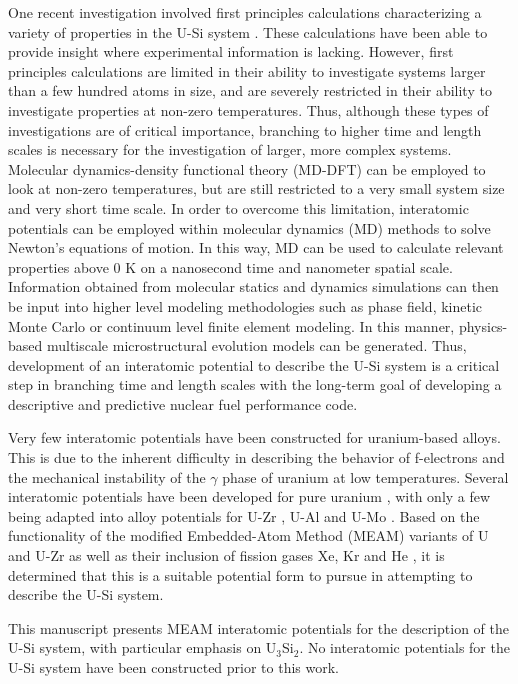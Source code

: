 \documentclass[review]{elsarticle}
\begin{document}
One recent investigation involved first principles calculations characterizing a variety of properties in the U-Si system \cite{noordhoek2016}.  These calculations have been able to provide insight where experimental information is lacking.  However, first principles calculations are limited in their ability to investigate systems larger than a few hundred atoms in size, and are severely restricted in their ability to investigate properties at non-zero temperatures.  Thus, although these types of investigations are of critical importance, branching to higher time and length scales is necessary for the investigation of larger, more complex systems.  Molecular dynamics-density functional theory (MD-DFT) can be employed to look at non-zero temperatures, but are still restricted to a very small system size and very short time scale.  In order to overcome this limitation, interatomic potentials can be employed within molecular dynamics (MD) methods to solve Newton's equations of motion.  In this way, MD can be used to calculate relevant properties above 0 K on a nanosecond time and nanometer spatial scale.  Information obtained from molecular statics and dynamics simulations can then be input into higher level modeling methodologies such as phase field, kinetic Monte Carlo or continuum level finite element modeling.  In this manner, physics-based multiscale microstructural evolution models can be generated.  Thus, development of an interatomic potential to describe the U-Si system is a critical step in branching time and length scales with the long-term goal of developing a descriptive and predictive nuclear fuel performance code.

Very few interatomic potentials have been constructed for uranium-based alloys.  This is due to the inherent difficulty in describing the behavior of f-electrons and the mechanical instability of the $\gamma$ phase of uranium at low temperatures.   Several interatomic potentials have been developed for pure uranium \cite{beeler_meam, beelerASTM, fernandez2014, li2011, smirnova2012, li2012}, with only a few being adapted into alloy potentials for U-Zr \cite{moore2015},  U-Al \cite{pascuet2012} and U-Mo \cite{smirnovaUMo}.  Based on the functionality of the modified Embedded-Atom Method (MEAM) variants of U and U-Zr \cite{beeler_meam, moore2015} as well as their inclusion of fission gases Xe, Kr and He \cite{beelerASTM}, it is determined that this is a suitable potential form to pursue in attempting to describe the U-Si system.  

This manuscript presents MEAM interatomic potentials for the description of the U-Si system, with particular emphasis on U$_{3}$Si$_{2}$.  No interatomic potentials for the U-Si system have been constructed prior to this work.
\end{document}
